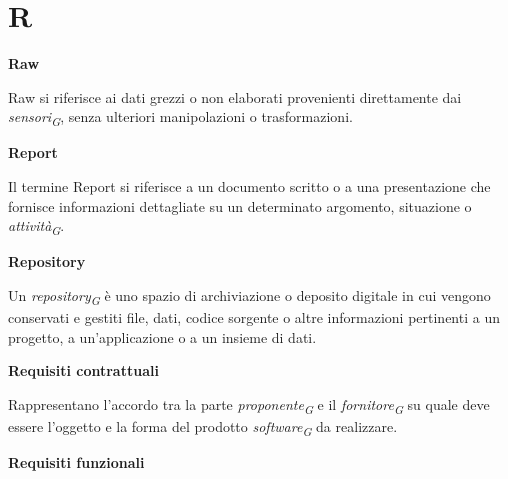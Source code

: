 \documentclass{article}
\begin{document}
\pagebreak
\section*{R}
{}

\vspace{0.4cm}

\textbf{Raw}

\vspace{0.1cm}

Raw si riferisce ai dati grezzi o non elaborati provenienti direttamente dai \textit{sensori}\textsubscript{\textit{G}}, senza ulteriori manipolazioni o trasformazioni.

\vspace{0.4cm}

\textbf{Report}

\vspace{0.1cm}

Il termine Report si riferisce a un documento scritto o a una presentazione che fornisce informazioni dettagliate su un determinato argomento, situazione o \textit{attività}\textsubscript{\textit{G}}.

\vspace{0.4cm}

\textbf{Repository}

\vspace{0.1cm}

Un \textit{repository}\textsubscript{\textit{G}} è uno spazio di archiviazione o deposito digitale in cui vengono conservati e gestiti file, dati, codice sorgente o altre informazioni pertinenti a un progetto, a un'applicazione o a un insieme di dati.

\vspace{0.4cm}

\textbf{Requisiti contrattuali}

\vspace{0.1cm}

Rappresentano l’accordo tra la parte \textit{proponente}\textsubscript{\textit{G}} e il \textit{fornitore}\textsubscript{\textit{G}} su quale deve essere l’oggetto e la forma del prodotto \textit{software}\textsubscript{\textit{G}} da realizzare.

\vspace{0.4cm}

\textbf{Requisiti funzionali}

\vspace{0.1cm}
\end{document}

